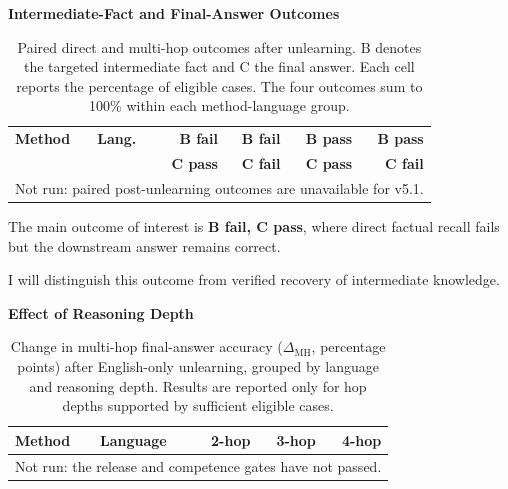 \documentclass[10pt,a4paper]{article}
\renewcommand{\arraystretch}{1.17}
\begin{document}

\textbf{Intermediate-Fact and Final-Answer Outcomes}

\begin{table}[H]
\centering
\scriptsize
\setlength{\tabcolsep}{3pt}
\renewcommand{\arraystretch}{1.15}

\begin{tabularx}{\linewidth}{@{}llrrrr@{}}
\toprule
\textbf{Method} &
\textbf{Lang.} &
\textbf{B fail} &
\textbf{B fail} &
\textbf{B pass} &
\textbf{B pass} \\
 & &
\textbf{C pass} &
\textbf{C fail} &
\textbf{C pass} &
\textbf{C fail} \\
\midrule

\multicolumn{6}{c}{Not run: paired post-unlearning outcomes are unavailable for v5.1.} \\

\bottomrule
\end{tabularx}

\caption{
Paired direct and multi-hop outcomes after unlearning.
B denotes the targeted intermediate fact and C the
final answer. Each cell reports the percentage of
eligible cases. The four outcomes sum to 100\%
within each method-language group.
}
\label{tab:persistence}
\end{table}

The main outcome of interest is
\textbf{B fail, C pass}, where direct factual
recall fails but the downstream answer remains correct.

I will distinguish this outcome from verified
recovery of intermediate knowledge.


\textbf{Effect of Reasoning Depth}

\begin{table}[htbp]
\centering
\small
\setlength{\tabcolsep}{4pt}

\begin{tabularx}{\linewidth}{@{}Xlrrr@{}}
\toprule
\textbf{Method} &
\textbf{Language} &
\textbf{2-hop} &
\textbf{3-hop} &
\textbf{4-hop} \\
\midrule

\multicolumn{5}{c}{Not run: the release and competence gates have not passed.} \\

\bottomrule
\end{tabularx}

\caption{
Change in multi-hop final-answer accuracy
($\Delta_{\mathrm{MH}}$, percentage points)
after English-only unlearning, grouped
by language and reasoning depth.
Results are reported only for hop depths
supported by sufficient eligible cases.
}
\label{tab:hop_depth}
\end{table}
\end{document}
